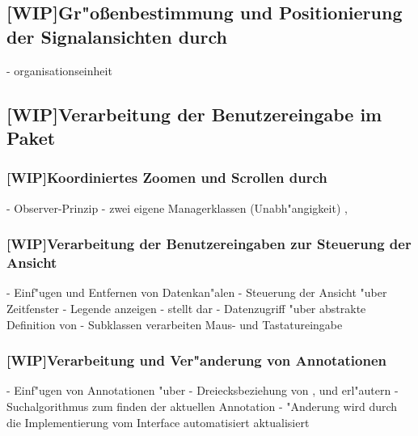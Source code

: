 \subsection{[WIP]Gr"o{\ss}enbestimmung und Positionierung der Signalansichten durch }
\label{sec:signalpanel_organisation}

- organisationseinheit

\subsection{[WIP]Verarbeitung der Benutzereingabe im Paket }
\label{sec:userinput}


\subsubsection{[WIP]Koordiniertes Zoomen und Scrollen durch }

- Observer-Prinzip
- zwei eigene Managerklassen (Unabh"angigkeit) , 

\subsubsection{[WIP]Verarbeitung der Benutzereingaben zur Steuerung der Ansicht}

- Einf"ugen und Entfernen von Datenkan"alen
- Steuerung der Ansicht "uber Zeitfenster
- Legende anzeigen
-  stellt dar
- Datenzugriff "uber abstrakte Definition von 
- Subklassen verarbeiten Maus- und Tastatureingabe

\subsubsection{[WIP]Verarbeitung und Ver"anderung von Annotationen}

- Einf"ugen von Annotationen "uber 
- Dreiecksbeziehung von ,  und  erl"autern
- Suchalgorithmus zum finden der aktuellen Annotation
- "Anderung wird durch die Implementierung vom Interface  automatisiert aktualisiert

